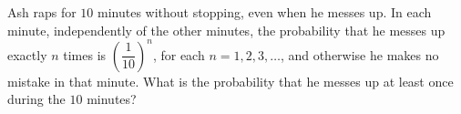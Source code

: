 Ash raps for $10$ minutes without stopping, even when he messes up. In each minute, independently of the other minutes, the probability that he messes up exactly $n$ times is $\left(\dfrac{1}{10}\right)^n$, for each $n=1,2,3,\dots$, and otherwise he makes no mistake in that minute. What is the probability that he messes up at least once during the $10$ minutes?

